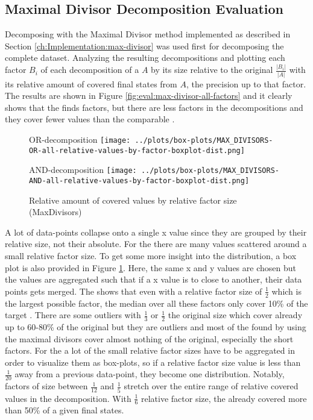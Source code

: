\subsection{Maximal Divisor Decomposition Evaluation}
Decomposing with the Maximal Divisor method implemented as described in Section \ref{ch:Implementation:max-divisor} was used first for decomposing the complete dataset.
Analyzing the resulting decompositions and plotting each factor $B_i$ of each decomposition of a \DFA $A$ by its size relative to the original $\frac{|B_i|}{|A|}$ with its relative amount of covered final states from $A$, the precision up to that factor.
The results are shown in Figure \ref{fig:eval:max-divisor-all-factors} and it clearly shows that the \orDecomp finds factors, but there are less factors in the decompositions and they cover fewer values than the comparable \andDecomp.
\begin{figure}[h]
	\begin{minipage}[h]{0.49\linewidth}
		\centering
		OR-decomposition
		\texttt{[image: ../plots/box-plots/MAX\_DIVISORS-OR-all-relative-values-by-factor-boxplot-dist.png]}
	\end{minipage}
	\begin{minipage}[h]{0.49\linewidth}
		\centering
		AND-decomposition
		\texttt{[image: ../plots/box-plots/MAX\_DIVISORS-AND-all-relative-values-by-factor-boxplot-dist.png]}
	\end{minipage}
	\caption{Relative amount of covered values by relative factor size (MaxDivisors)}
	\label{fig:eval:max-divisor-all-factors-box-plot}
\end{figure}
A lot of data-points collapse onto a single x value since they are grouped by their relative size, not their absolute.
For the \andDecomp there are many values scattered around a small relative factor size.
To get some more insight into the distribution, a box plot is also provided in Figure \ref{fig:eval:max-divisor-all-factors-box-plot}.
Here, the same x and y values are chosen but the values are aggregated such that if a x value is to close to another, their data points gets merged.
The \orDecomp shows that even with a relative factor size of $\frac{1}{2}$ which is the largest possible factor, the median over all these factors only cover 10\% of the target \DFA.
There are some outliers with $\frac{1}{3}$ or $\frac{1}{2}$ the original size which cover already up to 60-80\% of the original \DFA but they are outliers and most of the \orDecomp found by using the maximal divisors cover almost nothing of the original, especially the short factors.
For the \andDecomp a lot of the small relative factor sizes have to be aggregated in order to visualize them as box-plots, so if a relative factor size value is less than $\frac{1}{20}$ away from a previous data-point, they become one distribution.
Notably, factors of size between $\frac{1}{12}$ and $\frac{1}{5}$ stretch over the entire range of relative covered values in the decomposition. With $\frac{1}{6}$ relative factor size, the \andDecomp already covered more than 50\% of a given \DFAs final states.

